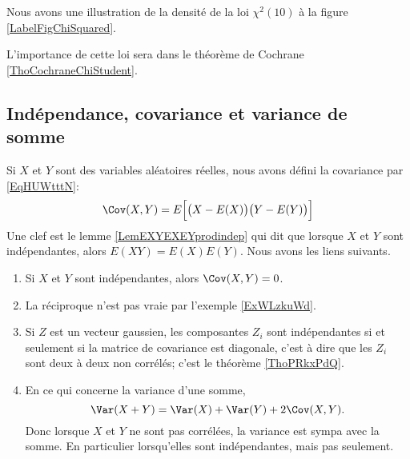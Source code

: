 Nous avons une illustration de la densité de la loi \( \chi^2(10)\) à la figure \ref{LabelFigChiSquared}.
\newcommand{\CaptionFigChiSquared}{La densité de $\chi^2(10)$.}


L'importance de cette loi sera dans le théorème de Cochrane \ref{ThoCochraneChiStudent}.

\subsection{Indépendance, covariance et variance de somme}
\label{subsecTTHohur}

Si \( X\) et \( Y\) sont des variables aléatoires réelles, nous avons défini la covariance par \eqref{EqHUWtttN}:
\begin{equation}   
    \Cov(X,Y)=E\Big[ \big( X-E(X) \big)\big( Y-E(Y) \big) \Big]
\end{equation}
Une clef est le lemme \ref{LemEXYEXEYprodindep} qui dit que lorsque \( X\) et \( Y\) sont indépendantes, alors \( E(XY)=E(X)E(Y)\). Nous avons les liens suivants.
\begin{enumerate}
    \item
        Si \( X\) et \( Y\) sont indépendantes, alors \( \Cov(X,Y)=0\).
    \item
        La réciproque n'est pas vraie par l'exemple \ref{ExWLzkuWd}.
    \item
        Si \( Z\) est un vecteur gaussien, les composantes \( Z_i\) sont indépendantes si et seulement si la matrice de covariance est diagonale, c'est à dire que les \( Z_i\) sont deux à deux non corrélés; c'est le théorème \ref{ThoPRkxPdQ}.
    \item 
        En ce qui concerne la variance d'une somme,
        \begin{equation}
            \Var(X+Y)=\Var(X)+\Var(Y)+2\Cov(X,Y).
        \end{equation}
        Donc lorsque \( X\) et \( Y\) ne sont pas corrélées, la variance est sympa avec la somme. En particulier lorsqu'elles sont indépendantes, mais pas seulement.
\end{enumerate}

